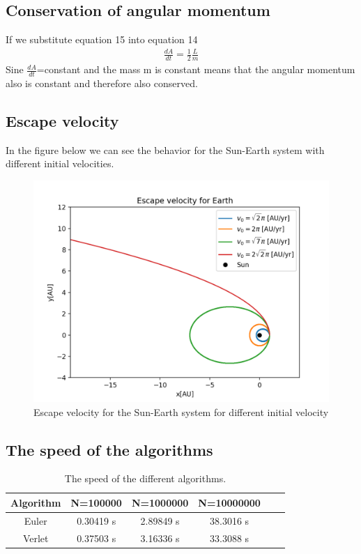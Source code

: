 \documentclass{article}
\begin{document}
\begin{multicols}{2}
\subsection{Conservation of angular momentum}
If we substitute equation 15 into equation 14 
\begin{align}
    \frac{dA}{dt}=\frac{1}{2}\frac{L}{m}
\end{align}
Sine $\frac{dA}{dt}$=constant and the mass m is constant means that the angular momentum also is constant and therefore also conserved.  
\\
\subsection{Escape velocity}
In the figure below we can see the behavior for the Sun-Earth system with different initial velocities. 
\begin{figure}[H]
	\centering
	\includegraphics[width=\linewidth]{esc_vel_plot.png}
	\caption{Escape velocity for the Sun-Earth system for different initial velocity}
	\label{fig:1bplot}
\end{figure}

\subsection{The speed of the algorithms}

\begin{table}[H]
\begin{center}
\begin{tabular}{  |c|c|c|c|c|c| } \hline
Algorithm&N=100000&N=1000000&N=10000000 \\ \hline
Euler&0.30419 s&2.89849 s&38.3016 s\\ \hline
Verlet&0.37503 s&3.16336 s &33.3088 s \\ \hline
\end{tabular}
\caption{The speed of the different algorithms.}
\label{tab:Algo_N}
\end{center}
\end{table}


\end{multicols}
\end{document}
